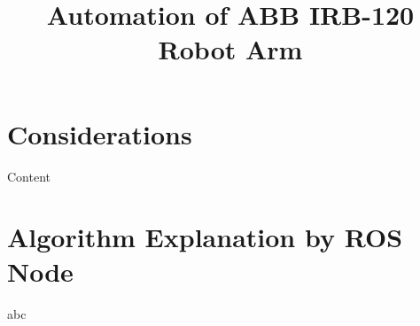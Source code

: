 \documentclass[11pt]{article}
\title{Automation of ABB IRB-120 Robot Arm}
\begin{document}
\maketitle

\section{Considerations}
Content

\section{Algorithm Explanation by ROS Node}
abc
\end{document}
